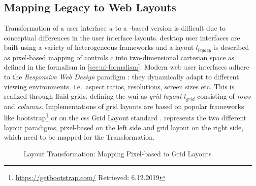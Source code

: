 \vspace{-10pt}
\hypertarget{sec:uitransformation.problem}{%
\subsection{Mapping Legacy to Web Layouts}\label{sec:uitransformation.problem}}
\vspace{10pt}

\gls{Transformation} of a  user interface \(u\) to a -based version is difficult due to conceptual differences in the user interface layouts.
 desktop user interfaces are built using a variety of heterogeneous frameworks and a \legacy layout \(l_{legacy}\) is described as  pixel-based mapping of controls \(c\) into two-dimensional cartesian space as defined in the formalism in \cref{sec:ui-formalism}. 
Modern \gls{web} user interfaces adhere to the \emph{Responsive Web Design} paradigm \autocite{Marcotte2010Responsive,Nebeling2013Responsive}: they dynamically adapt to different viewing environments, i.e.~aspect ratios, resolutions, screen sizes etc.
This is realized through fluid grids, defining the \gls{wui} as \emph{grid layout} \(l_{grid}\) consisting of \emph{rows} and \emph{columns}.
Implementations of grid layouts are based on popular frameworks like bootstrap\footnote{\url{https://getbootstrap.com/} Retrieved: 6.12.2019} or on the \gls{css} Grid Layout standard \autocite{W3C2017CSSGrid}.
 represents the two different layout paradigms, pixel-based on the left side and grid layout on the right side, which need to be mapped for the \gls{Transformation}.

\begin{figure}[h!]
\centering

\qquad
{}

\caption{Layout Transformation: Mapping Pixel-based to Grid Layouts}
\label{fig:uitransformer.layout}
\end{figure}

